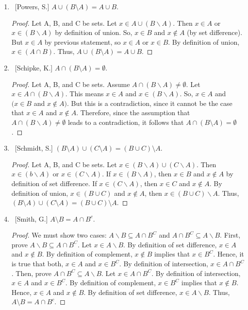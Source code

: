 \documentclass[10pt]{article}
\begin{document}
\begin{enumerate}
\begin{enumerate}
	\item  ~[Powers, S.] $A \cup (B \setminus A) = A \cup B$.
\begin{proof}
Let A, B, and C be sets.  Let $x \in A \cup (B \backslash A)$.  Then $x \in A$ or $x \in (B \backslash A)$ by definition of union.  So, $x \in B$ and $x \notin A$ (by set difference).  But $x \in A$ by previous statement, so $x \in A$ or $x \in B$.  By definition of union, $x \in (A \cap B)$.  Thus, $A \cup (B \setminus A) = A \cup B$.
\end{proof}
	\item  ~[Schipke, K.] $A \cap (B \setminus A) = \emptyset$.
 \begin{proof}
Let A, B, and C be sets.  Assume $A \cap (B \backslash A) \neq \emptyset$.  Let $x \in A \cap (B \backslash A)$.  This means $x \in A$ and $x \in (B \backslash A)$.  So, $x \in A$ and $(x \in B$ and $x \notin A)$.  But this is a contradiction, since it cannot be the case that $x \in A$ and $x \notin A$.  Therefore, since the assumption that $A \cap (B \backslash A) \neq \emptyset$ leads to a contradiction, it follows that $A \cap (B \setminus A) = \emptyset$.
\end{proof}
	\item  ~[Schmidt, S.] $(B \setminus A) \cup (C \setminus A) = (B \cup C) \setminus A$.
 \begin{proof}
Let A, B, and C be sets.  Let $x \in (B \backslash A) \cup (C \backslash A)$.  Then $x \in (b \backslash A)$ or $x \in (C \backslash A)$.  If $x \in (B \backslash A)$, then $x \in B$ and $x \notin A$ by definition of set difference.  If $x \in (C \backslash A)$, then $x \in C$ and $x \notin A$.  By definition of union, $x \in (B \cup C)$ and $x \notin A$, then $x \in (B \cup C)\backslash A$.  Thus, $(B \setminus A) \cup (C \setminus A) = (B \cup C) \setminus A$.   
 \end{proof}
	\item  ~[Smith, G.] $A \setminus B = A \cap B^c$.
\begin{proof}
We must show two cases: $A \backslash B \subseteq A \cap B^C$ and $A \cap B^C \subseteq A \backslash B$.  First, prove $A \backslash B \subseteq A \cap B^C$.  Let $x \in A \backslash B$.  By definition of set difference, $x \in A$ and $x \notin B$.  By definition of complement, $x \notin B$ implies that $x \in B^C$.  Hence, it is true that both, $x \in A$ and $x \in B^C$.  By definition of intersection, $x \in A \cap B^C$.  Then, prove $A \cap B^C \subseteq A \backslash B$.  Let $x \in A \cap B^C$.  By definition of intersection, $x \in A$ and $x \in B^C$.  By definition of complement, $x \in B^C$ implies that $x \notin B$.  Hence, $x \in A$ and $x \notin B$.  By definition of set difference, $x \in A \backslash B$.  Thus, $A \setminus B = A \cap B^c$.

\end{proof}
\end{enumerate}
\end{enumerate}
\end{document}
